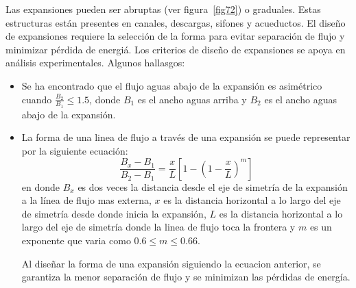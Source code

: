 \documentclass[11pt, oneside]{article}
\begin{document}
Las expansiones pueden ser abruptas (ver figura~\ref{fig72}) o graduales. Estas estructuras est\'an presentes en canales, descargas, sifones y acueductos. El diseño de expansiones requiere la selecci\'on de la forma para evitar separaci\'on de flujo y minimizar p\'erdida de energi\'a. Los criterios de diseño de expansiones se apoya en an\'alisis experimentales. Algunos hallasgos:
\begin{itemize}
    \item Se ha encontrado que el flujo aguas abajo de la expansi\'on es asim\'etrico cuando $\frac{B_2}{B_1} \leq 1.5$, donde $B_1$ es el ancho aguas arriba y $B_2$ es el ancho aguas abajo de la expansi\'on. 
    \item La forma de una linea de flujo a trav\'es de una expansi\'on se puede representar por la siguiente ecuaci\'on:
    \begin{equation}
        \frac{B_x - B_1}{B_2 - B_1} = \frac{x}{L} \left[ 1- \left(1-\frac{x}{L}\right)^m \right]
        \label{eq1}
    \end{equation}
    en donde $B_x$ es dos veces la distancia desde el eje de simetr\'ia de la expansi\'on a la l\'inea de flujo mas externa, $x$ es la distancia horizontal a lo largo del eje de simetr\'ia desde donde inicia la expansi\'on, $L$ es la distancia horizontal a lo largo del eje de simetr\'ia donde la linea de flujo toca la frontera y $m$ es un exponente que varia como $0.6\leq m \leq 0.66$. 
    
    Al diseñar la forma de una expansi\'on siguiendo la ecuacion anterior, se garantiza la menor separaci\'on de flujo y se minimizan las p\'erdidas de energ\'ia. 
\end{itemize}
\end{document}
